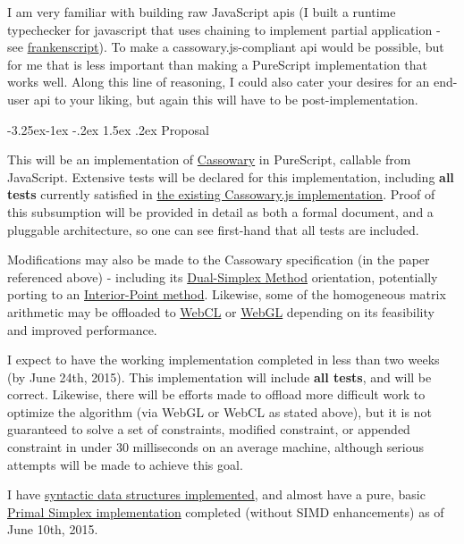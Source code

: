 \documentclass[11pt,pressrelease]{newlfm} %
\makeatletter
\newcounter{section}
\newcounter{subsection}[section]
\newcommand\subsection{\@startsection{subsection}{2}{\z@}%
                                     {-3.25ex\@plus -1ex \@minus -.2ex}%
                                     {1.5ex \@plus .2ex}%
                                     {\normalfont\large\bfseries}}
\makeatother
\begin{document}
\begin{newlfm}
\begin{singlespace}
I am very familiar with building raw JavaScript apis (I built a runtime typechecker for javascript
that uses chaining to implement partial application - see
\href{http://github.com/athanclark/frankenscript}{frankenscript}). To make a cassowary.js-compliant
api would be possible, but for me that is less important than making a PureScript implementation that works
well. Along this line of reasoning, I could also cater your desires for an end-user api to your liking,
but again this will have to be post-implementation.

\subsection{Proposal}

This will be an implementation of
\href{https://constraints.cs.washington.edu/solvers/cassowary-tochi.pdf}{Cassowary}
in PureScript, callable from JavaScript.
Extensive tests will be declared for this implementation, including \textbf{all tests} currently
satisfied in
\href{https://github.com/slightlyoff/cassowary.js/tree/master/tests}{the existing Cassowary.js implementation}.
Proof of this subsumption will be provided in detail as both a formal document, and a pluggable
architecture, so one can see first-hand that all tests are included.

Modifications may also be made to the Cassowary specification (in the paper referenced above) -
including its
\href{https://www.me.utexas.edu/~jensen/ORMM/supplements/methods/lpmethod/S1_dualsimplex.pdf}{Dual-Simplex Method}
orientation, potentially porting to an
\href{http://en.wikipedia.org/wiki/Mehrotra_predictor%E2%80%93corrector_method}{Interior-Point method}.
Likewise, some of the homogeneous matrix arithmetic may be offloaded to
\href{https://www.khronos.org/webcl/}{WebCL} or
\href{https://developer.mozilla.org/en-US/docs/Web/WebGL}{WebGL} depending on its feasibility
and improved performance.

I expect to have the working implementation completed in less than two weeks (by June 24th, 2015).
This implementation will include \textbf{all tests}, and will be correct. Likewise, there will be
efforts made to offload more difficult work to optimize the algorithm (via WebGL or WebCL as stated
above), but it is not guaranteed to solve a set of constraints, modified constraint, or appended
constraint in under 30 milliseconds on an average machine, although serious attempts will be made
to achieve this goal.

I have
\href{http://hackage.haskell.org/package/linear-grammar}{syntactic data structures implemented},
and almost have a pure, basic
\href{https://github.com/athanclark/simplex-basic}{Primal Simplex implementation} completed
(without SIMD enhancements) as of June 10th, 2015.


\end{singlespace}
\end{newlfm}
\end{document}

